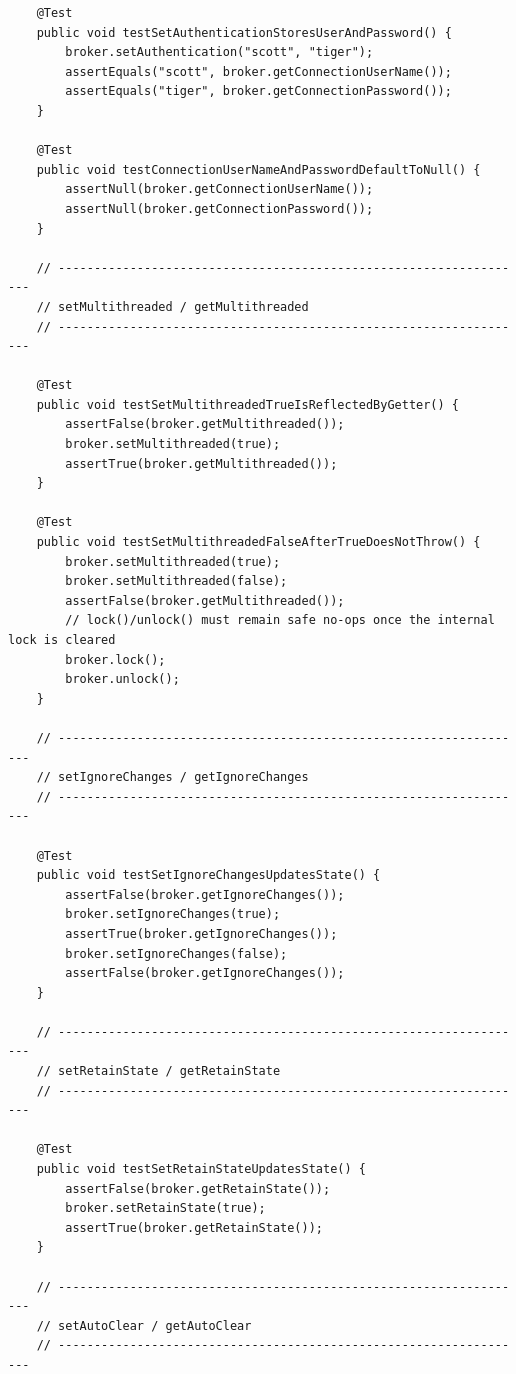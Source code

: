 \begin{lstlisting}
    @Test
    public void testSetAuthenticationStoresUserAndPassword() {
        broker.setAuthentication("scott", "tiger");
        assertEquals("scott", broker.getConnectionUserName());
        assertEquals("tiger", broker.getConnectionPassword());
    }

    @Test
    public void testConnectionUserNameAndPasswordDefaultToNull() {
        assertNull(broker.getConnectionUserName());
        assertNull(broker.getConnectionPassword());
    }

    // ------------------------------------------------------------------
    // setMultithreaded / getMultithreaded
    // ------------------------------------------------------------------

    @Test
    public void testSetMultithreadedTrueIsReflectedByGetter() {
        assertFalse(broker.getMultithreaded());
        broker.setMultithreaded(true);
        assertTrue(broker.getMultithreaded());
    }

    @Test
    public void testSetMultithreadedFalseAfterTrueDoesNotThrow() {
        broker.setMultithreaded(true);
        broker.setMultithreaded(false);
        assertFalse(broker.getMultithreaded());
        // lock()/unlock() must remain safe no-ops once the internal lock is cleared
        broker.lock();
        broker.unlock();
    }

    // ------------------------------------------------------------------
    // setIgnoreChanges / getIgnoreChanges
    // ------------------------------------------------------------------

    @Test
    public void testSetIgnoreChangesUpdatesState() {
        assertFalse(broker.getIgnoreChanges());
        broker.setIgnoreChanges(true);
        assertTrue(broker.getIgnoreChanges());
        broker.setIgnoreChanges(false);
        assertFalse(broker.getIgnoreChanges());
    }

    // ------------------------------------------------------------------
    // setRetainState / getRetainState
    // ------------------------------------------------------------------

    @Test
    public void testSetRetainStateUpdatesState() {
        assertFalse(broker.getRetainState());
        broker.setRetainState(true);
        assertTrue(broker.getRetainState());
    }

    // ------------------------------------------------------------------
    // setAutoClear / getAutoClear
    // ------------------------------------------------------------------


\end{lstlisting}
